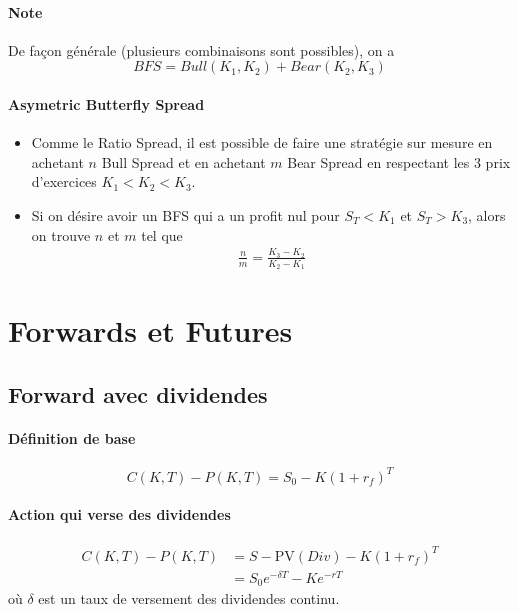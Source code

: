 \documentclass[10pt, french]{article}
\begin{document}
\begin{multicols*}{2}
\paragraph{Note} De façon générale (plusieurs combinaisons sont possibles), on a
\[BFS = Bull(K_1, K_2) + Bear(K_2, K_3) \]


\paragraph{Asymetric Butterfly Spread}
\begin{itemize}
\item Comme le Ratio Spread, il est possible de faire une stratégie sur mesure en achetant $n$ Bull Spread et en achetant $m$ Bear Spread en respectant les 3 prix d'exercices $K_1 < K_2 < K_3$.
\item Si on désire avoir un BFS qui a un profit nul pour $S_T < K_1$ et $S_T > K_3$, alors on trouve $n$ et $m$ tel que
\begin{align*}
\frac{n}{m} = \frac{K_3 - K_2}{K_2 - K_1}
\end{align*}
\end{itemize}

\setcounter{section}{4}
\section{Forwards et Futures}
\subsection*{Forward avec dividendes}
\paragraph{Définition de base}
\[C(K,T) - P(K,T) = S_0 - K(1+r_f)^{T}\]

\paragraph{Action qui verse des dividendes}
\begin{align*}
C(K,T) - P(K,T) 		& = S - \text{PV}(Div) - K(1 + r_f)^{T} \\
& = S_0 e^{-\delta T} - K e^{-rT}
\end{align*}
où $\delta$ est un taux de versement des dividendes continu. \\


\end{multicols*}
\end{document}
